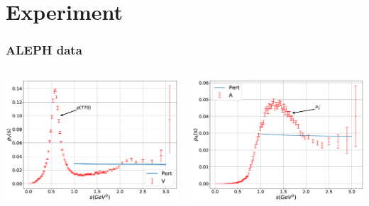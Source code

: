 \documentclass{beamer}
\begin{document}
\section{Experiment}
\begin{frame}
  \frametitle{ALEPH data}
  \begin{columns}{\textwidth}
    \begin{column}{0.5\textwidth}
      \includegraphics[width=\textwidth]{./images/specFuncAleph_V.eps}
    \end{column}
    \begin{column}{0.5\textwidth}
      \includegraphics[width=\textwidth]{./images/specFuncAleph_A.eps}
    \end{column}
  \end{columns}
\end{frame}
\end{document}

